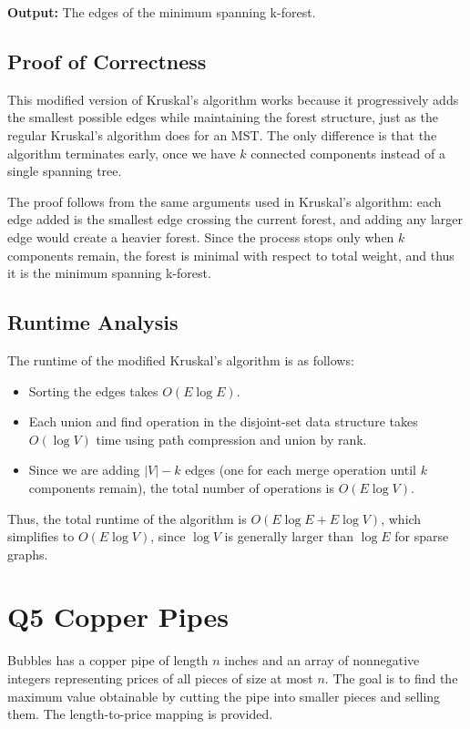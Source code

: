 \documentclass[11pt]{article}
\begin{document}
\textbf{Output:} The edges of the minimum spanning k-forest.

\subsection*{Proof of Correctness}
This modified version of Kruskal’s algorithm works because it progressively adds the smallest possible edges while maintaining the forest structure, just as the regular Kruskal’s algorithm does for an MST. The only difference is that the algorithm terminates early, once we have \( k \) connected components instead of a single spanning tree.

The proof follows from the same arguments used in Kruskal's algorithm: each edge added is the smallest edge crossing the current forest, and adding any larger edge would create a heavier forest. Since the process stops only when \( k \) components remain, the forest is minimal with respect to total weight, and thus it is the minimum spanning k-forest.

\subsection*{Runtime Analysis}

The runtime of the modified Kruskal’s algorithm is as follows:
\begin{itemize}
    \item Sorting the edges takes \( O(E \log E) \).
    \item Each union and find operation in the disjoint-set data structure takes \( O(\log V) \) time using path compression and union by rank.
    \item Since we are adding \( |V| - k \) edges (one for each merge operation until \( k \) components remain), the total number of operations is \( O(E \log V) \).
\end{itemize}

Thus, the total runtime of the algorithm is \( O(E \log E + E \log V) \), which simplifies to \( O(E \log V) \), since \( \log V \) is generally larger than \( \log E \) for sparse graphs.


\newpage

\section*{Q5 Copper Pipes}

Bubbles has a copper pipe of length \( n \) inches and an array of nonnegative integers representing prices of all pieces of size at most \( n \). The goal is to find the maximum value obtainable by cutting the pipe into smaller pieces and selling them. The length-to-price mapping is provided.
\end{document}
